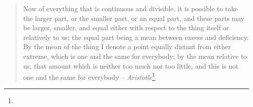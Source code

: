 \FloatBarrier
\label{sec:ageharmonic}
\begin{singlespace}
\begin{quote}
Now of everything that is continuous and divisible, it is possible to take the larger 
part, or the smaller part, or an equal part, and these parts may be larger, smaller, 
and equal either with respect to the thing itself or relatively to us; the equal part
 being a mean between excess and deficiency. By the mean of the thing I denote a point 
 equally distant from either extreme, which is one and the same for everybody; by the 
 mean relative to us, that amount which is neither too much nor too little, and this 
 is not one and the same for everybody -- \textit{Aristotle}\footnote{}
\end{quote}
\end{singlespace}

